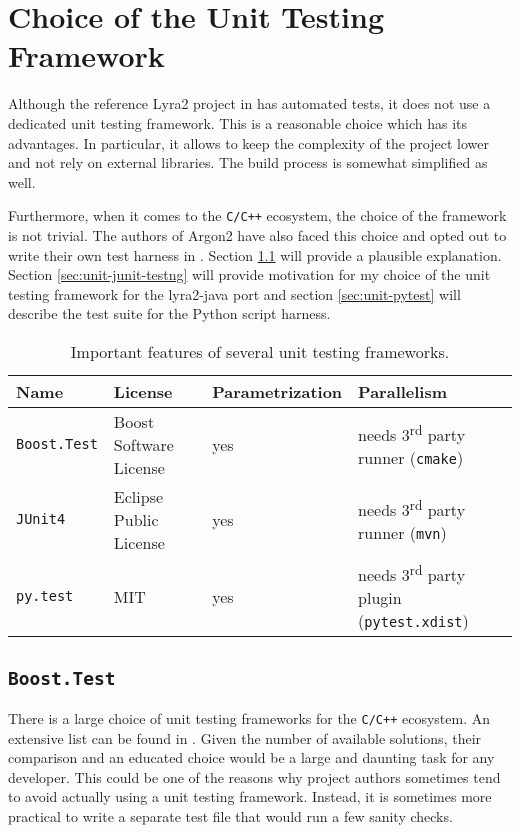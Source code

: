 \section{Choice of the Unit Testing Framework}
\label{sec:unit-choice}

Although the reference Lyra2 project in \cite{github:2017:lyra} has automated tests, it does not use a dedicated unit testing framework. This is a reasonable choice which has its advantages. In particular, it allows to keep the complexity of the project lower and not rely on external libraries. The build process is somewhat simplified as well.

Furthermore, when it comes to the \texttt{C/C++} ecosystem, the choice of the framework is not trivial. The authors of Argon2 have also faced this choice and opted out to write their own test harness in \cite{github:2017:argon2-test.c}. Section \ref{sec:unit-boost-google} will provide a plausible explanation. Section \ref{sec:unit-junit-testng} will provide motivation for my choice of the unit testing framework for the lyra2-java port and section \ref{sec:unit-pytest} will describe the test suite for the Python script harness.

\begin{table}
\begin{tabular}{llll}
    Name & License & Parametrization & Parallelism \\ \hline
\texttt{Boost.Test} & Boost Software License & yes & needs 3\textsuperscript{rd} party runner (\texttt{cmake}) \\
\texttt{JUnit4} & Eclipse Public License & yes & needs 3\textsuperscript{rd} party runner (\texttt{mvn}) \\
\texttt{py.test} & MIT & yes & needs 3\textsuperscript{rd} party plugin (\texttt{pytest.xdist})
\end{tabular}
\caption{Important features of several unit testing frameworks.}
\label{table:framework-features-cpp}
\end{table}

\subsection{\texttt{Boost.Test}}
\label{sec:unit-boost-google}

There is a large choice of unit testing frameworks for the \texttt{C/C++} ecosystem. An extensive list can be found in \cite{wiki:2017:frameworks-c, wiki:2017:frameworks-cpp}. Given the number of available solutions, their comparison and an educated choice would be a large and daunting task for any developer. This could be one of the reasons why project authors sometimes tend to avoid actually using a unit testing framework. Instead, it is sometimes more practical to write a separate test file that would run a few sanity checks.

